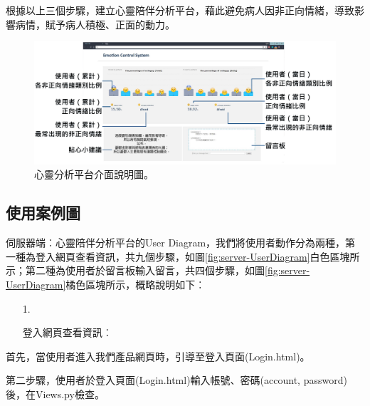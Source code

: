 \documentclass[12pt]{scrreprt}
\begin{document}
根據以上三個步驟，建立心靈陪伴分析平台，藉此避免病人因非正向情緒，導致影響病情，賦予病人積極、正面的動力。\\

\begin{figure}[!h]
\begin{center}
\includegraphics[width=1\textwidth]{./figs/Web.pdf}
\end{center}
\caption{心靈分析平台介面說明圖。}
\label{fig:WebInterface}
\end{figure}

\subsection{使用案例圖}%

伺服器端︰心靈陪伴分析平台的User Diagram，我們將使用者動作分為兩種，第一種為登入網頁查看資訊，共九個步驟，如圖\ref{fig:server-UserDiagram}白色區塊所示；第二種為使用者於留言板輸入留言，共四個步驟，如圖\ref{fig:server-UserDiagram}橘色區塊所示，概略說明如下︰

\begin{itemize}
\item[1.]{\begin{bfseries}登入網頁查看資訊︰\end{bfseries}}
\end{itemize}

首先，當使用者進入我們產品網頁時，引導至登入頁面(Login.html)。

第二步驟，使用者於登入頁面(Login.html)輸入帳號、密碼(account, password)後，在Views.py檢查。
\end{document}
